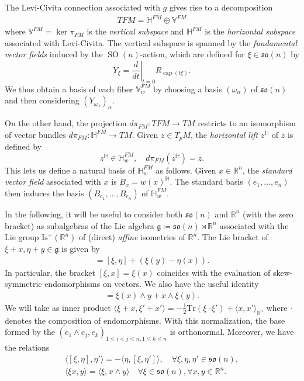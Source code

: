 \documentclass[12pt]{amsart}
\numberwithin{numbering}{section}
\theoremstyle{plain}
\theoremstyle{definition}
\theoremstyle{remark}
\numberwithin{equation}{section}
\DeclareMathOperator{\SO}{SO}
\newcommand{\pfm}{\pi_{FM}}
\newcommand{\dpfm}{d\pi_{FM}}
\newcommand{\R}{\mathbb{R}}
\newcommand{\HH}{\mathbb{H}}
\newcommand{\frk}[1]{\mathfrak{#1}}
\begin{document}
\smallskip

The Levi-Civita connection associated with $g$ gives rise to a decomposition 
\begin{align}
TFM = \mathbb{H}^{FM} \oplus \mathbb{V}^{FM} \label{eq:connect_FM}
\end{align}
where $\mathbb{V}^{FM} = \ker \pfm$ is the \emph{vertical subspace} and $\mathbb{H}^{FM}$ is the \emph{horizontal subspace} associated with Levi-Civita. The vertical subspace is spanned by the \emph{fundamental vector fields} induced by the $\SO(n)$-action, which are defined for $\xi \in \frk{so}(n)$ by
\[ Y_\xi = \left . \frac{d}{dt} \right \vert_{t=0} R_{\exp(t\xi)}. \]
We thus obtain a basis of each fiber $\mathbb{V}^{FM}_w$ by choosing a basis $(\omega_\alpha)$ of $\frk{so}(n)$ and then considering ${(Y_{\omega_\alpha})}_\alpha$. 

On the other hand, the projection $\dpfm: TFM \to TM$ restricts to an isomorphism of vector bundles $\dpfm : \mathbb{H}^{FM} \to TM$. Given $z \in T_p M$, the \emph{horizontal lift} $z^{\HH}$ of $z$ is defined by 
\[ z^{\mathbb{H}} \in \mathbb{H}_w^{FM}, \quad \dpfm(z^{\HH}) = z.\]
This lets us define a natural basis of $\mathbb{H}_w^{FM}$ as follows. Given $x \in \R^n$, the \emph{standard vector field} associated with $x$ is $B_x = {w(x)}^\HH$. The standard basis $(e_1, \ldots, e_n)$ then induces the basis $(B_{e_1}, \ldots, B_{e_n})$ of $\mathbb{H}^{FM}_w$.

\medskip 

In the following, it will be useful to consider both $\frk{so}(n)$ and $\R^n$ (with the zero bracket) as subalgebras of the Lie algebra $\frk{g} \coloneq \frk{so}(n) \rtimes \R^n$ associated with the Lie group $\mathrm{Is}^+(\R^n)$ of (direct) \emph{affine} isometries of $\R^n$. The Lie bracket of $\xi + x, \eta + y \in \frk{g}$ is given by 
\begin{align}
   [\xi + x, \eta + y] = [\xi, \eta] + (\xi(y) - \eta(x)). \label{eq:semi_direct}
\end{align}
In particular, the bracket $[\xi, x] = \xi(x)$ coincides with the evaluation of skew-symmetric endomorphisms on vectors. We also have the useful identity 
\begin{align}
[\xi, x \wedge y] = \xi(x) \wedge y + x \wedge \xi(y). \label{eq:bracket_wedge}
\end{align}
We will take as inner product $\langle \xi + x, \xi' + x' \rangle = - \frac{1}{2} \mathrm{Tr}(\xi \cdot \xi') + \langle x, x' \rangle_{\R^n}$ where $\cdot$ denotes the composition of endomorphisms. With this normalization, the base formed by the $(e_1 \wedge e_j, e_k)_{1 \leq i < j \leq n, 1 \leq k \leq n}$ is orthonormal. Moreover, we have the relations
\begin{align}
\langle [\xi, \eta], \eta' \rangle = - \langle \eta, [\xi, \eta'] \rangle, \quad \forall \xi, \eta, \eta' \in \frk{so}(n), \label{eq:bi_inv} \\
\langle \xi x, y \rangle = \langle \xi, x \wedge y \rangle \quad \forall \xi \in \frk{so}(n), \forall x, y \in \R^n. \label{eq:scalar_wedge}
\end{align}
\end{document}
